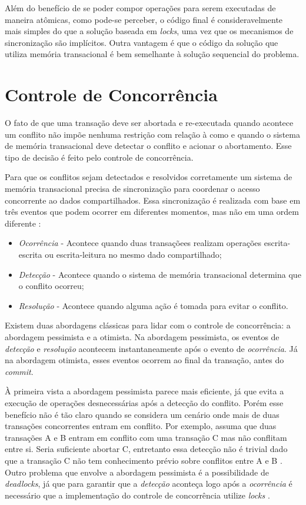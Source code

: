 Além do benefício de se poder compor operações para serem executadas de maneira atômicas, como pode-se perceber, o código final é consideravelmente mais simples do que a solução baseada em \emph{locks}, uma vez que os mecanismos de sincronização são implícitos. Outra vantagem é que o código da solução que utiliza memória transacional é bem semelhante à solução sequencial do problema.


\section{Controle de Concorrência}

O fato de que uma transação deve ser abortada e re-executada quando acontece um conflito não impõe nenhuma restrição com relação à como e quando o sistema de memória transacional deve detectar o conflito e acionar o abortamento. Esse tipo de decisão é feito pelo controle de concorrência.

Para que os conflitos sejam detectados e resolvidos corretamente um sistema de memória transacional precisa de sincronização para coordenar o acesso concorrente ao dados compartilhados. Essa sincronização é realizada com base em três eventos que podem ocorrer em diferentes momentos, mas não em uma ordem diferente \cite{harris2010transactional}:

\begin{itemize}
 \item \emph{Ocorrência} - Acontece quando duas transaçõees realizam operações escrita-escrita ou escrita-leitura no mesmo dado compartilhado;
 \item \emph{Detecção} - Acontece quando o sistema de memória transacional determina que o conflito ocorreu;
 \item \emph{Resolução} - Acontece quando alguma ação é tomada para evitar o conflito.
\end{itemize}

Existem duas abordagens clássicas para lidar com o controle de concorrência: a abordagem pessimista e a otimista. Na abordagem pessimista, os eventos de \emph{detecção} e \emph{resolução} acontecem instantaneamente após o evento de \emph{ocorrência}. Já na abordagem otimista, esses eventos ocorrem ao final da transação, antes do \emph{commit}.

À primeira vista a abordagem pessimista parece mais eficiente, já que evita a execução de operações desnecessárias após a detecção do conflito. Porém esse benefício não é tão claro quando se considera um cenário onde mais de duas transações concorrentes entram em conflito. Por exemplo, assuma que duas transações A e B entram em conflito com uma transação C mas não conflitam entre si. Seria suficiente abortar C, entretanto essa detecção não é trivial dado que a transação C não tem conhecimento prévio sobre conflitos entre A e B \cite{spear2006conflict}. Outro problema que envolve a abordagem pessimista é a possibilidade de \emph{deadlocks}, já que para garantir que a \emph{detecção} aconteça logo após a \emph{ocorrência} é necessário que a implementação do controle de concorrência utilize \emph{locks} \cite{harris2010transactional}.

